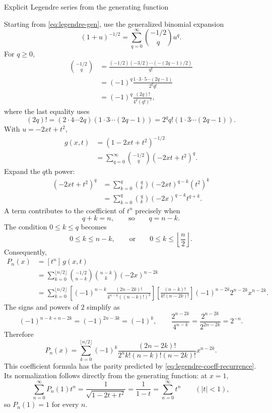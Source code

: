 \documentclass[11pt]{beamer}
\begin{document}
\begin{frame}[allowframebreaks]{Explicit Legendre series from the generating function}
\footnotesize

Starting from \eqref{eq:legendre-gen}, use the generalized binomial expansion
\[
  (1+u)^{-1/2}
    =\sum_{q=0}^{\infty}\binom{-1/2}{q}u^q.
\]
For $q\ge0$,
\begin{align*}
  \binom{-1/2}{q}
   &=
    \frac{(-1/2)(-3/2)\cdots(-(2q-1)/2)}{q!}\\
   &=
    (-1)^q\frac{1\cdot3\cdot5\cdots(2q-1)}{2^q q!}\\
   &=
    (-1)^q\frac{(2q)!}{4^q(q!)^2},
\end{align*}
where the last equality uses
\[
  (2q)!
    =(2\cdot4\cdots2q)(1\cdot3\cdots(2q-1))
    =2^q q!(1\cdot3\cdots(2q-1)).
\]
With $u=-2xt+t^2$,
\begin{align*}
  g(x,t)
   &=(1-2xt+t^2)^{-1/2}\\
   &=\sum_{q=0}^{\infty}
      \binom{-1/2}{q}(-2xt+t^2)^q.
\end{align*}
Expand the $q$th power:
\begin{align*}
  (-2xt+t^2)^q
   &=
    \sum_{k=0}^{q}
      \binom{q}{k}(-2xt)^{q-k}(t^2)^k\\
   &=
    \sum_{k=0}^{q}
      \binom{q}{k}(-2x)^{q-k}t^{q+k}.
\end{align*}
A term contributes to the coefficient of $t^n$ precisely when
\[
  q+k=n,
  \qquad\text{so}\qquad
  q=n-k.
\]
The condition $0\le k\le q$ becomes
\[
  0\le k\le n-k,
  \qquad\text{or}\qquad
  0\le k\le\left\lfloor\frac n2\right\rfloor.
\]
Consequently,
\begin{align*}
  P_n(x)
   &=[t^n]\,g(x,t)\\
   &=
    \sum_{k=0}^{\lfloor n/2\rfloor}
      \binom{-1/2}{n-k}
      \binom{n-k}{k}
      (-2x)^{n-2k}\\
   &=
    \sum_{k=0}^{\lfloor n/2\rfloor}
      \left[
        (-1)^{n-k}
        \frac{(2n-2k)!}
             {4^{n-k}((n-k)!)^2}
      \right]
      \left[
        \frac{(n-k)!}{k!(n-2k)!}
      \right]
      (-1)^{n-2k}2^{n-2k}x^{n-2k}.
\end{align*}
The signs and powers of $2$ simplify as
\[
  (-1)^{n-k+n-2k}=(-1)^{2n-3k}=(-1)^k,
  \qquad
  \frac{2^{n-2k}}{4^{n-k}}
    =\frac{2^{n-2k}}{2^{2n-2k}}
    =2^{-n}.
\]
Therefore
\begin{equation}
  P_n(x)
   =\sum_{k=0}^{\lfloor n/2\rfloor}
      (-1)^k
      \frac{(2n-2k)!}
           {2^n k!(n-k)!(n-2k)!}
      x^{n-2k}.
  \label{eq:legendre-series}
\end{equation}
This coefficient formula has the parity predicted by
\eqref{eq:legendre-coeff-recurrence}.  Its normalization follows directly from
the generating function: at $x=1$,
\[
  \sum_{n=0}^{\infty}P_n(1)t^n
   =\frac{1}{\sqrt{1-2t+t^2}}
   =\frac{1}{1-t}
   =\sum_{n=0}^{\infty}t^n
   \qquad (|t|<1),
\]
so $P_n(1)=1$ for every $n$.
\end{frame}
\end{document}
